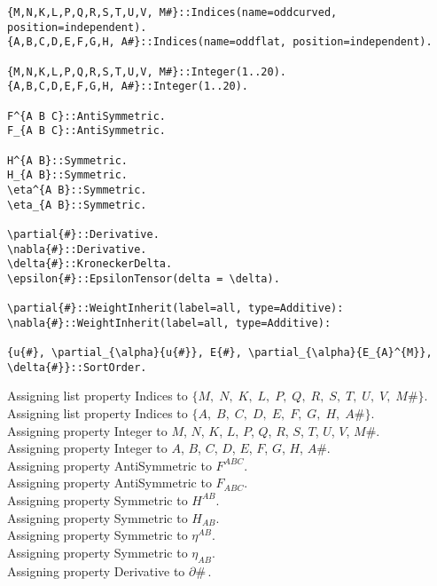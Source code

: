 \documentclass[11pt]{article}
\begin{document}
{\color[named]{Blue}\begin{verbatim}
{M,N,K,L,P,Q,R,S,T,U,V, M#}::Indices(name=oddcurved, position=independent).
{A,B,C,D,E,F,G,H, A#}::Indices(name=oddflat, position=independent).

{M,N,K,L,P,Q,R,S,T,U,V, M#}::Integer(1..20).
{A,B,C,D,E,F,G,H, A#}::Integer(1..20).

F^{A B C}::AntiSymmetric.
F_{A B C}::AntiSymmetric.

H^{A B}::Symmetric.
H_{A B}::Symmetric.
\eta^{A B}::Symmetric.
\eta_{A B}::Symmetric.

\partial{#}::Derivative.
\nabla{#}::Derivative.
\delta{#}::KroneckerDelta.
\epsilon{#}::EpsilonTensor(delta = \delta).

\partial{#}::WeightInherit(label=all, type=Additive):
\nabla{#}::WeightInherit(label=all, type=Additive):

{u{#}, \partial_{\alpha}{u{#}}, E{#}, \partial_{\alpha}{E_{A}^{M}}, \delta{#}}::SortOrder.
\end{verbatim}}
Assigning list property Indices to $\{M,\; N,\; K,\; L,\; P,\; Q,\; R,\; S,\; T,\; U,\; V,\; M\#\}$.
\\
Assigning list property Indices to $\{A,\; B,\; C,\; D,\; E,\; F,\; G,\; H,\; A\#\}$.
\\
Assigning property Integer to $M$, $N$, $K$, $L$, $P$, $Q$, $R$, $S$, $T$, $U$, $V$, $M\#$.
\\
Assigning property Integer to $A$, $B$, $C$, $D$, $E$, $F$, $G$, $H$, $A\#$.
\\
Assigning property AntiSymmetric to ${F}^{A B C}$.
\\
Assigning property AntiSymmetric to ${F}_{A B C}$.
\\
Assigning property Symmetric to ${H}^{A B}$.
\\
Assigning property Symmetric to ${H}_{A B}$.
\\
Assigning property Symmetric to ${\eta}^{A B}$.
\\
Assigning property Symmetric to ${\eta}_{A B}$.
\\
Assigning property Derivative to $\partial{\#}\, $.
\\
\end{document}
